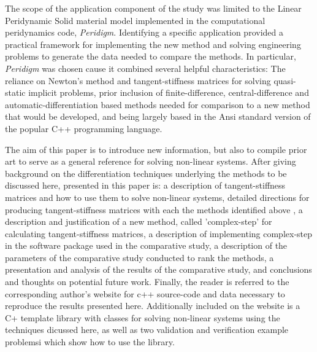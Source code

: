 \documentclass[preprint,12pt]{elsarticle}
\begin{document}
The scope of the application component of the study was limited to the Linear Peridynamic Solid
material model implemented in the computational peridynamics code, \emph{Peridigm}. Identifying a
specific application provided a practical framework for implementing the new method and solving
engineering problems to generate the data needed to compare the methods. In particular,
\emph{Peridigm} was chosen cause it combined several helpful characteristics: The reliance on
Newton's method and tangent-stiffness matrices for solving quasi-static implicit problems, prior
inclusion of finite-difference, central-difference and automatic-differentiation based methods
needed for comparison to a new method that would be developed, and being largely based in the Ansi
standard version of the popular C++ programming language.

The aim of this paper is to introduce new information, but also to compile prior art to serve as a
general reference for solving non-linear systems.  After giving background on the
 differentiation techniques underlying the methods to be
discussed here, presented in this paper is: a description of tangent-stiffness matrices and how to
use them to solve non-linear systems, detailed directions for producing tangent-stiffness matrices
with each the methods identified above , a description and justification of a new method, called 'complex-step' for calculating
tangent-stiffness matrices, a description of implementing complex-step in the software package used
in the comparative study, a description of the parameters of the comparative study conducted to rank
the methods, a presentation and analysis of the results of the comparative study, and
conclusions and thoughts on potential future work. Finally, the reader is referred to the
corresponding author's website for c++ source-code and data necessary to reproduce the results
presented here. Additionally included on the website is a C+ template library with classes for
solving non-linear systems using the techniques dicussed here, as well as two validation and
verification example problemsi which show how to use the library.
\end{document}
